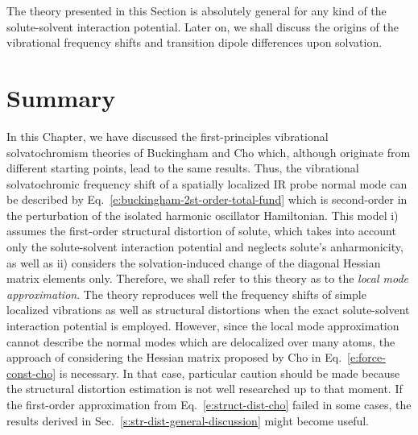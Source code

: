 \documentclass[a4paper,titlepage,twoside,fleqn,12pt]{book}
\begin{document}
\begin{refsection}
The theory presented in this Section is absolutely general 
for any kind of the solute\hyp{}solvent
interaction potential. Later on, we shall discuss the origins of the
vibrational frequency shifts and transition dipole differences
upon solvation.


\section{Summary}

In this Chapter, we have discussed the first\hyp{}principles
vibrational solvatochromism theories of Buckingham and Cho which,
although originate from different starting points, lead to the same results.
Thus, the vibrational solvatochromic frequency shift of a spatially localized 
IR probe normal mode can be described by Eq.~\eqref{e:buckingham-2st-order-total-fund}
which is second-order in the perturbation of the isolated harmonic oscillator Hamiltonian.
This model i) assumes the first\hyp{}order structural distortion of solute, which takes 
into account only the solute\hyp{}solvent interaction potential and neglects
solute's anharmonicity, as well as ii) considers the solvation\hyp{}induced change of the diagonal
Hessian matrix elements only. Therefore, we shall refer to this theory
as to the \emph{local mode approximation}. The theory reproduces well the frequency shifts of
simple localized vibrations as well as structural distortions
when the exact solute\hyp{}solvent interaction potential
is employed. However, since the local mode approximation cannot describe the normal modes
which are delocalized over many atoms, the approach of considering
the Hessian matrix proposed by Cho in Eq.~\eqref{e:force-const-cho} is necessary. 
In that case, particular caution should be made because the structural
distortion estimation is not well researched up to that moment. If the
first-order approximation from Eq.~\eqref{e:struct-dist-cho} failed in some cases, the results 
derived in Sec.~\ref{s:str-dist-general-discussion} might become useful.

\printbibliography[heading=subbibintoc,title={References}]
\end{refsection}
\end{document}
